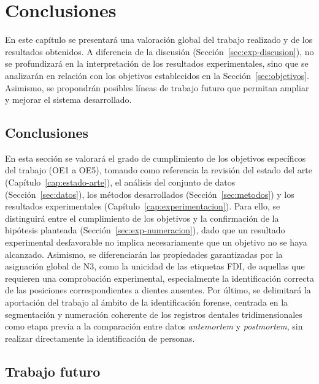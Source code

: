 \chapter{Conclusiones}
\label{cap:conclusiones}

En este capítulo se presentará una valoración global del trabajo realizado y de los resultados obtenidos. A diferencia de la discusión (Sección~\ref{sec:exp-discusion}), no se profundizará en la interpretación de los resultados experimentales, sino que se analizarán en relación con los objetivos establecidos en la Sección~\ref{sec:objetivos}. Asimismo, se propondrán posibles líneas de trabajo futuro que permitan ampliar y mejorar el sistema desarrollado.

\section{Conclusiones}
\label{sec:conc-conclusiones}

En esta sección se valorará el grado de cumplimiento de los objetivos específicos del trabajo (OE1 a OE5), tomando como referencia la revisión del estado del arte (Capítulo~\ref{cap:estado-arte}), el análisis del conjunto de datos (Sección~\ref{sec:datos}), los métodos desarrollados (Sección~\ref{sec:metodos}) y los resultados experimentales (Capítulo~\ref{cap:experimentacion}). Para ello, se distinguirá entre el cumplimiento de los objetivos y la confirmación de la hipótesis planteada (Sección~\ref{sec:exp-numeracion}), dado que un resultado experimental desfavorable no implica necesariamente que un objetivo no se haya alcanzado. Asimismo, se diferenciarán las propiedades garantizadas por la asignación global de N3, como la unicidad de las etiquetas FDI, de aquellas que requieren una comprobación experimental, especialmente la identificación correcta de las posiciones correspondientes a dientes ausentes. Por último, se delimitará la aportación del trabajo al ámbito de la identificación forense, centrada en la segmentación y numeración coherente de los registros dentales tridimensionales como etapa previa a la comparación entre datos \textit{antemortem} y \textit{postmortem}, sin realizar directamente la identificación de personas.

\section{Trabajo futuro}
\label{sec:conc-trabajo-futuro}

